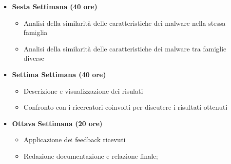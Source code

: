 {\begin{itemize}
        \item \textbf{Sesta Settimana (40 ore)} 
        \begin{itemize}
            \item Analisi della similarità delle caratteristiche dei malware nella stessa famiglia
            \item Analisi della similarità delle caratteristiche dei malware tra famiglie diverse
        \end{itemize}
        \item \textbf{Settima Settimana (40 ore)} 
        \begin{itemize}
            \item Descrizione e visualizzazione dei risulati
            \item Confronto con i ricercatori coinvolti per discutere i risultati ottenuti 
        \end{itemize}
        \item \textbf{Ottava Settimana (20 ore)} 
        \begin{itemize}
            \item Applicazione dei feedback ricevuti
            \item Redazione documentazione e relazione finale;
        \end{itemize}
    \end{itemize}
}

\newcommand{\totaleOre}{300}

\newcommand{\obiettiviObbligatori}{
	 \item \underline{\textit{O01}}: Creazione di un dataset di malware classificato per categoria
	 \item \underline{\textit{O02}}: Implementazione di un sistema per identificare i malware basato su deep learning
	 \item \underline{\textit{O03}}: Creazione di un modello avversario (GAN) per generare malware
	 \item \underline{\textit{O04}}: Valutazione delle performance del modello secondo tecniche di Explenable AI
	 \item \underline{\textit{O05}}: Valutazione delle performance del modello tramite ablation analysis
	 
}

\newcommand{\obiettiviDesiderabili}{
	 \item \underline{\textit{D01}}: Analisi esaustiva dei modelli tramite Explanable AI
	 \item \underline{\textit{D02}}: Analisi approfondita dei risultati degli esperimenti;
}

\newcommand{\obiettiviFacoltativi}{
	 \item \underline{\textit{F01}}: Implementazione di diversi modelli per identificazione di malware.
	 \item \underline{\textit{F02}}: Implementazione di diverse architetture per la generazione di malware.
}